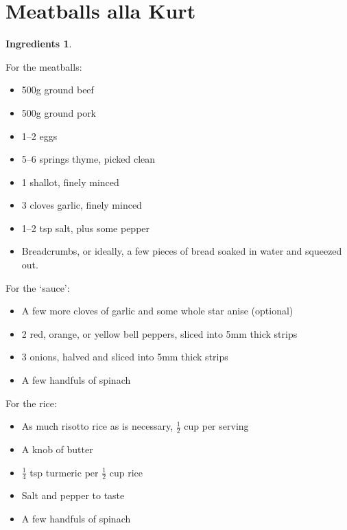 \documentclass[a4paper,12pt]{scrreprt}
\theoremstyle{definition}
\newtheorem*{ingredients}{Ingredients}
\theoremstyle{plain}
\theoremstyle{remark}
\begin{document}
\section{Meatballs alla Kurt}\label{sec:meatballs_a_la_kurt}
\begin{ingredients}
  $\,$

  For the meatballs:
  \begin{multicols}{2}
    \begin{itemize}
      \item 500g ground beef

      \item 500g ground pork

      \item 1--2 eggs

      \item 5--6 springs thyme, picked clean

      \item 1 shallot, finely minced

      \item 3 cloves garlic, finely minced

      \item 1--2 tsp salt, plus some pepper

      \item Breadcrumbs, or ideally, a few pieces of bread soaked in water and squeezed out.
    \end{itemize}
  \end{multicols}
  For the `sauce':
  \begin{multicols}{2}

    \begin{itemize}
      \item A few more cloves of garlic and some whole star anise (optional)

      \item 2 red, orange, or yellow bell peppers, sliced into 5mm thick strips

      \item 3 onions, halved and sliced into 5mm thick strips

      \item A few handfuls of spinach
    \end{itemize}
  \end{multicols}
  For the rice:
  \begin{multicols}{2}
    \begin{itemize}
      \item As much risotto rice as is necessary, $\frac{1}{2}$ cup per serving

      \item A knob of butter

      \item $\frac{1}{4}$ tsp turmeric per $\frac{1}{2}$ cup rice

      \item Salt and pepper to taste

      \item A few handfuls of spinach
    \end{itemize}
  \end{multicols}
\end{ingredients}
\end{document}
